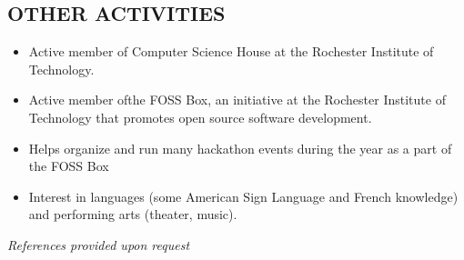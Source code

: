 \documentclass[line]{res}
\begin{document}
\begin{resume}
\section{OTHER ACTIVITIES}
	\begin{itemize}[leftmargin=10pt]
	\item Active member of Computer Science House at the Rochester Institute of Technology.
	\item Active member ofthe FOSS Box, an initiative at the Rochester Institute of Technology that promotes open source software development.
	\item Helps organize and run many hackathon events during the year as a part of the FOSS Box
	\item Interest in languages (some American Sign Language and French knowledge) and performing arts (theater, music).
	\end{itemize}

\begin{center}
\vspace{-0.26in}
\emph{References provided upon request\\[8pt]}
\end{center}

\end{resume}
\end{document}
